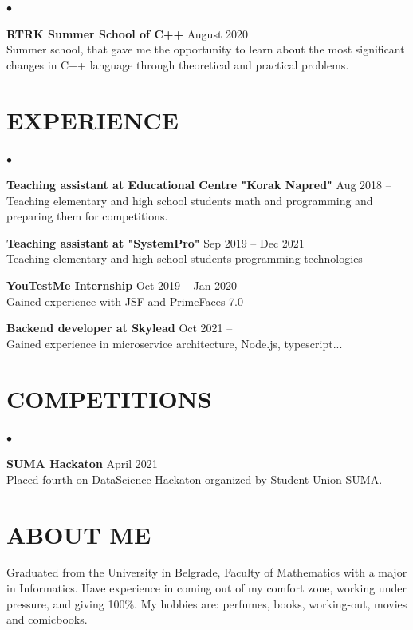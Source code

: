 \documentclass[margin,center]{res}
\newenvironment{list2}{
  \begin{list}{$\bullet$}{%
      \setlength{\itemsep}{0in}
      \setlength{\parsep}{0in} \setlength{\parskip}{0in}
      \setlength{\topsep}{0in} \setlength{\partopsep}{0in}
      \setlength{\leftmargin}{0.2in}}}{\end{list}}
\begin{document}
\begin{resume}
\begin{list2}
  \item {\bf RTRK Summer School of C++} \hfill August 2020\\
    Summer school, that gave me the opportunity to learn about the
    most significant changes in C++ language through theoretical and
    practical problems.

\end{list2}


\section{EXPERIENCE} 
\begin{list2}
  \item{\bf Teaching assistant at Educational Centre "Korak Napred"}  \hfill Aug 2018 --\\
    Teaching elementary and high school students math and programming and preparing them for competitions.
  \item{\bf Teaching assistant at "SystemPro"}  \hfill Sep 2019 -- Dec 2021\\
    Teaching elementary and high school students programming technologies 
  \item{\bf YouTestMe Internship}  \hfill Oct 2019 -- Jan 2020\\
    Gained experience with JSF and PrimeFaces 7.0 
  \item{\bf Backend developer at Skylead} \hfill Oct 2021 --\\
    Gained experience in microservice architecture, Node.js, typescript...

\end{list2}

\section{COMPETITIONS}
\begin{list2}
\item{\bf SUMA Hackaton} \hfill April 2021\\
  Placed fourth on DataScience Hackaton organized by Student Union SUMA.
\end{list2}

\section{ABOUT ME}  
Graduated from the University in Belgrade, Faculty of Mathematics with a major in Informatics.
Have experience in coming out of my comfort zone, working under pressure, and giving 100\%.  
My hobbies are: perfumes, books, working-out, movies and comicbooks. 



\end{resume}
\end{document}
